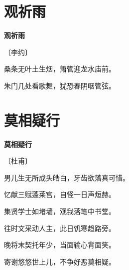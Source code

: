 \documentclass[12pt,UTF-8,openany,fontset=none]{ctexbook}
\begin{document}
\vspace{8pt}
\clearpage

\section{观祈雨}


\begin{center}
    {\bfseries 观祈雨}

    \vspace{18pt}

    \begin{large}\xuwen
        〔李约〕
    \end{large}

\end{center}

    \vspace{18pt}  %

\begin{center}
    \begin{Large}

        桑条无叶土生烟，箫管迎龙水庙前。

        朱门几处看歌舞，犹恐春阴咽管弦。

    \end{Large}

\end{center}

\vspace{8pt}
\clearpage

\section{莫相疑行}


\begin{center}
    {\bfseries 莫相疑行}

    \vspace{18pt}

    \begin{large}\xuwen
        〔杜甫〕
    \end{large}

\end{center}

    \vspace{18pt}  %

\begin{center}
    \begin{Large}

        男儿生无所成头皓白，牙齿欲落真可惜。\phantom{男..}

        忆献三赋蓬莱宫，自怪一日声烜赫。

        集贤学士如堵墙，观我落笔中书堂。

        往时文采动人主，此日饥寒趋路旁。

        晚将末契托年少，当面输心背面笑。

        寄谢悠悠世上儿，不争好恶莫相疑。

    \end{Large}

\end{center}
\end{document}
